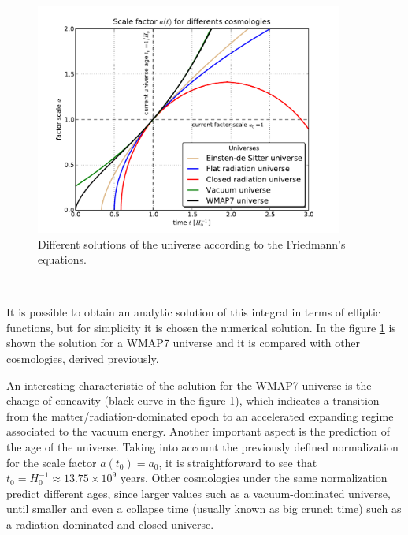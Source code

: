 \
\begin{figure}[htbp]
	\centering
	\includegraphics[width=0.9\textwidth]
	{./figures/2_theoretical_framework/Friedmann_Solution.pdf}

	\caption{\small{Different solutions of the universe according to the
	Friedmann's equations.}}
	
	\label{fig:Cosmologies}
\end{figure}
\

It is possible to obtain an analytic solution of this integral in terms of
elliptic functions, but for simplicity it is chosen the numerical solution.
In the figure \ref{fig:Cosmologies} is shown the solution for a WMAP7 
universe and it is compared with other cosmologies, derived previously.


An interesting characteristic of the solution for the WMAP7 universe is 
the change of concavity (black curve in the figure \ref{fig:Cosmologies}), 
which indicates a transition from the matter/radiation-dominated epoch
to an accelerated expanding regime associated to the vacuum energy.
Another important aspect is the prediction of the age of the universe.
Taking into account the previously defined normalization for the scale
factor $a(t_0) = a_0$, it is straightforward to see that $t_0 = H_0^{-1} 
\approx 13.75 \times 10^9$ years. Other cosmologies under the same 
normalization predict different ages, since larger values such as a 
vacuum-dominated universe, until smaller and even a collapse time (usually
known as big crunch time) such as a radiation-dominated and closed 
universe.



